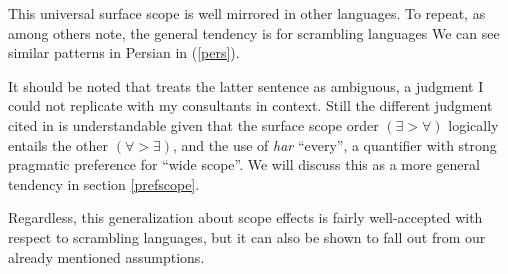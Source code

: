 \documentclass{article}
\begin{document}
This universal surface scope is well mirrored in other languages.
To repeat, as \textcite{pafel04,karimi03} among others note, the general tendency is for scrambling languages
We can see similar patterns in Persian in (\ref{pers}).

\begin{exe}
\ex \begin{xlist}
\label{pers}
\end{xlist}
\end{exe}

It should be noted that \textcite{karimi03} treats the latter sentence as ambiguous, a judgment I could not replicate with my consultants in context.
Still the different judgment cited in \textcite{karimi03} is understandable given that the surface scope order $({\exists} > {\forall})$ logically entails the other $({\forall} > {\exists})$, and the use of \emph{har} ``every'', a quantifier with strong pragmatic preference for ``wide scope''.
We will discuss this as a more general tendency in section \ref{prefscope}.



Regardless, this generalization about scope effects is fairly well-accepted with respect to scrambling languages, but it can also be shown to fall out from our already mentioned assumptions.
\end{document}
